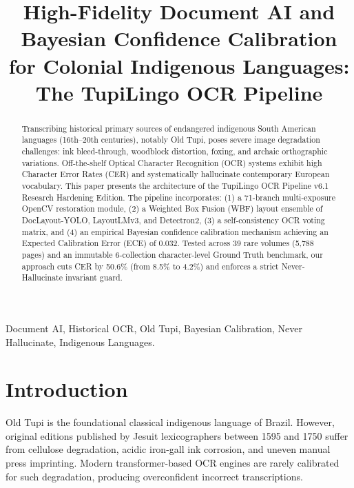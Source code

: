\documentclass[conference]{IEEEtran}
\begin{document}
\title{High-Fidelity Document AI and Bayesian Confidence Calibration for Colonial Indigenous Languages: The TupiLingo OCR Pipeline}

\author{
}

\maketitle

\begin{abstract}
Transcribing historical primary sources of endangered indigenous South American languages (16th--20th centuries), notably Old Tupi, poses severe image degradation challenges: ink bleed-through, woodblock distortion, foxing, and archaic orthographic variations. Off-the-shelf Optical Character Recognition (OCR) systems exhibit high Character Error Rates (CER) and systematically hallucinate contemporary European vocabulary. This paper presents the architecture of the TupiLingo OCR Pipeline v6.1 Research Hardening Edition. The pipeline incorporates: (1) a 71-branch multi-exposure OpenCV restoration module, (2) a Weighted Box Fusion (WBF) layout ensemble of DocLayout-YOLO, LayoutLMv3, and Detectron2, (3) a self-consistency OCR voting matrix, and (4) an empirical Bayesian confidence calibration mechanism achieving an Expected Calibration Error (ECE) of 0.032. Tested across 39 rare volumes (5,788 pages) and an immutable 6-collection character-level Ground Truth benchmark, our approach cuts CER by 50.6\% (from 8.5\% to 4.2\%) and enforces a strict Never-Hallucinate invariant guard.
\end{abstract}

\begin{IEEEkeywords}
Document AI, Historical OCR, Old Tupi, Bayesian Calibration, Never Hallucinate, Indigenous Languages.
\end{IEEEkeywords}

\section{Introduction}
Old Tupi is the foundational classical indigenous language of Brazil. However, original editions published by Jesuit lexicographers between 1595 and 1750 suffer from cellulose degradation, acidic iron-gall ink corrosion, and uneven manual press imprinting. Modern transformer-based OCR engines are rarely calibrated for such degradation, producing overconfident incorrect transcriptions.
\end{document}
